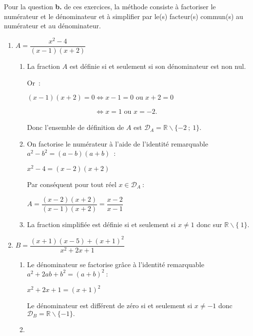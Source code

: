 \begin{corrige}
     Pour la question \textbf{b.} de ces exercices, la méthode consiste à factoriser le numérateur et le dénominateur et à simplifier par le(s) facteur(s) commun(s) au numérateur et au dénominateur.
     \begin{enumerate}
          \item %
          $A=\dfrac{x^2-4}{(x-1)(x+2)}$
          \begin{enumerate}[label=\alph*.]
               \item %
               La fraction $A$ est définie si et seulement si son dénominateur est non nul.
               \par
               Or~:
\par
               $(x-1)(x+2)=0 \Leftrightarrow x-1 = 0 \text{ ou } x+2=0$
\par
               $\phantom{(x-1)(x+2)=0} \Leftrightarrow x = 1 \text{ ou } x=-2.$
               \par
               Donc l'ensemble de définition de $A$ est $\mathscr{D}_A=\mathbb{R} \backslash \{-2~;~1\}.$
               \item %
               On factorise le numérateur à l'aide de l'identité remarquable $a^2-b^2=(a-b)(a+b)$~:
               \par
               $x^2-4=(x-2)(x+2)$
               \par
               Par conséquent pour tout réel $x \in \mathscr{D}_A~:$
               \par
               $A=\dfrac{(x-2)(x+2)}{(x-1)(x+2)}$\nosp$= \dfrac{x-2}{x-1}$
               \item %
               La fraction simplifiée est définie si et seulement si $x \neq 1$ donc sur $\mathbb{R} \backslash \{~1\}.$
          \end{enumerate}
          \item %
          $B=\dfrac{(x+1)(x-5)+(x+1)^2}{x^2+2x+1}$
          \begin{enumerate}[label=\alph*.]
               \item %
               Le dénominateur se factorise grâce à l'identité remarquable $a^2+2ab+b^2=(a+b)^2~:$
               \par
               $x^2+2x+1=(x+1)^2$
               \par
               Le dénominateur est différent de zéro si et seulement si $x \neq -1$ donc $\mathscr{D}_B=\mathbb{R} \backslash \{-1\}.$
               \item %

\end{enumerate}
\end{enumerate}
\end{corrige}

